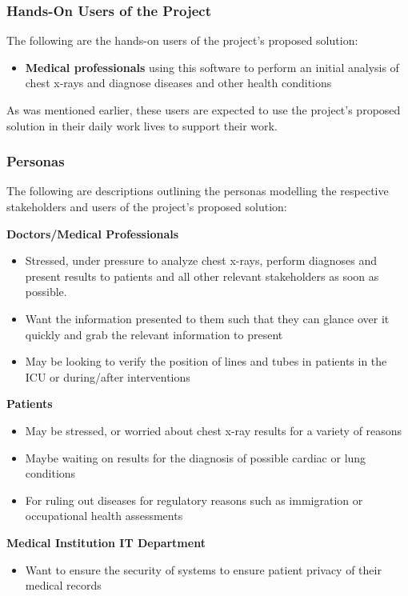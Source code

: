 \documentclass[12pt]{article}
\begin{document}
\subsubsection{Hands-On Users of the Project}
The following are the hands-on users of the project’s proposed solution:
\begin{itemize}
    \item \textbf{Medical professionals} using this software to perform an initial analysis of chest x-rays and diagnose diseases and other health conditions 
\end{itemize}
As was mentioned earlier, these users are expected to use the project's proposed solution in their daily work lives to support their work.

\subsubsection{Personas}
The following are descriptions outlining the personas modelling the respective stakeholders and users of the project’s proposed solution:
\begin{itemize}
    \begin{item}
        \textbf{Doctors/Medical Professionals}
        \begin{itemize}
            \item Stressed, under pressure to analyze chest x-rays, perform diagnoses and present results to patients and all other relevant stakeholders as soon as possible. 
            \item Want the information presented to them such that they can glance over it quickly and grab the relevant information to present 
            \item May be looking to verify the position of lines and tubes in patients in the ICU or during/after interventions 
        \end{itemize}
    \end{item}
    \begin{item}
        \textbf{Patients}
        \begin{itemize}
            \item May be stressed, or worried about chest x-ray results for a variety of reasons 
            \item Maybe waiting on results for the diagnosis of possible cardiac or lung conditions 
            \item For ruling out diseases for regulatory reasons such as immigration or occupational health assessments 
        \end{itemize}
    \end{item}
    \begin{item}
        \textbf{Medical Institution IT Department}
        \begin{itemize}
            \item Want to ensure the security of systems to ensure patient privacy of their medical records 
        \end{itemize}
    \end{item}
\end{itemize}
\end{document}
